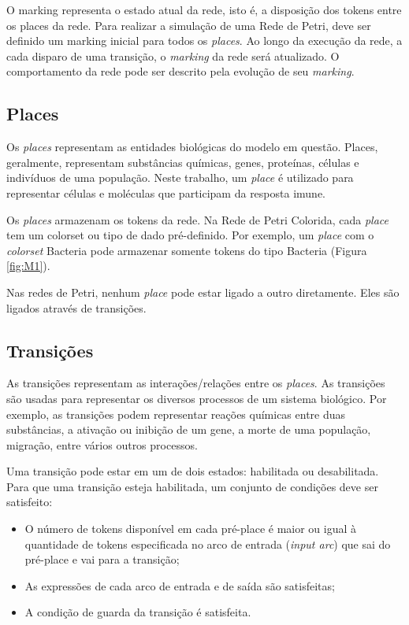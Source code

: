 \documentclass[a4paper,10pt]{article}
\begin{document}
			O marking representa o estado atual da rede, isto é, a disposição dos tokens entre os places da rede. 
			Para realizar a simulação de uma Rede de Petri, deve ser definido um marking inicial para todos os \textit{places}. 
			Ao longo da execução da rede, a cada disparo de uma transição, o \textit{marking} da rede será atualizado\cite{Liu2012}.
			O comportamento da rede pode ser descrito pela evolução de seu \textit{marking}.
		
		\subsection{Places}
		
			Os \textit{places} representam as entidades biológicas do modelo em questão. Places, geralmente, representam 
			substâncias químicas, genes, proteínas, células e indivíduos de uma população. 
			Neste trabalho, um \textit{place} é utilizado para representar células e moléculas que participam da resposta imune.
			
			Os \textit{places} armazenam os tokens da rede. 												
			Na Rede de Petri Colorida, cada \textit{place} tem um colorset ou tipo de dado pré-definido. Por exemplo, 
			um \textit{place} com o \textit{colorset} Bacteria pode armazenar somente tokens do tipo Bacteria (Figura \ref{fig:M1}).
			
			Nas redes de Petri, nenhum \textit{place} pode estar ligado a outro diretamente. 
			Eles são ligados através de transições. 
		
		\subsection{Transições}\label{Transicoes}
		
			As transições representam as interações/relações entre os \textit{places}. 
			As transições são usadas para representar os diversos processos de um sistema biológico. Por exemplo, 
			as transições podem representar reações químicas entre duas substâncias, a ativação ou inibição de um gene, 
			a morte de uma população, migração, entre vários outros processos. 			 
			
			Uma transição pode estar em um de dois estados: habilitada ou desabilitada. %
			Para que uma transição esteja habilitada, um conjunto de condições deve ser satisfeito: 
			\begin{itemize}
			 \item O número de tokens disponível em cada pré-place é maior ou igual à quantidade de tokens 
			 especificada no arco de entrada (\textit{input arc}) que sai do pré-place e vai para a transição;
			 \item As expressões de cada arco de entrada e de saída são satisfeitas; 
			 \item A condição de guarda da transição é satisfeita.			 
			\end{itemize}
\end{document}
